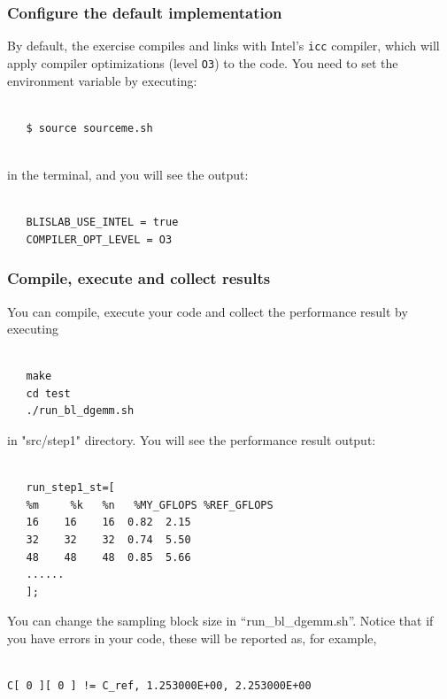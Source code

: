 \subsubsection{Configure the default implementation}
By default, the exercise compiles and links with Intel's {\tt icc} compiler, which will apply compiler optimizations (level {\tt O3}) to the code.
You need to set the environment variable by executing:
\begin{verbatim}

   $ source sourceme.sh
   
\end{verbatim}
in the terminal, and you will see the output:
\begin{verbatim}

   BLISLAB_USE_INTEL = true
   COMPILER_OPT_LEVEL = O3

\end{verbatim}

\subsubsection{Compile, execute and collect results}
You can compile, execute your code and collect the performance result by executing
\begin{verbatim}

   make
   cd test
   ./run_bl_dgemm.sh

\end{verbatim}
in "src/step1" directory. You will see the performance result output:
\begin{verbatim}

   run_step1_st=[
   %m     %k   %n   %MY_GFLOPS %REF_GFLOPS
   16    16    16  0.82  2.15
   32    32    32  0.74  5.50
   48    48    48  0.85  5.66
   ......
   ];

\end{verbatim}
You can change the sampling block size in ``run\_bl\_dgemm.sh''.
Notice that if you have errors in your code, these will be reported as, for example, 
\begin{verbatim}

C[ 0 ][ 0 ] != C_ref, 1.253000E+00, 2.253000E+00

\end{verbatim}

